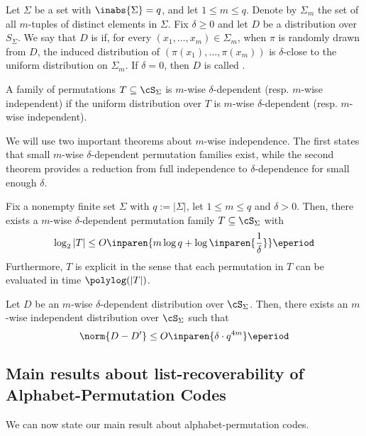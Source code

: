 \documentclass[11pt]{article}
\begin{document}
\begin{definition}
  Let $\Sigma$ be a set with $\inabs{\Sigma} = q$, and let $1 \le m \le q$. Denote by $\Sigma_m$ the set of all $m$-tuples of distinct elements in $\Sigma$. Fix $\delta \ge 0$ and let $D$ be a distribution over $S_\Sigma$. 
  We say that $D$ is  if, for every $(x_1,\dots,x_m) \in \Sigma_m$, when $\pi$ is randomly drawn from $D$, the induced distribution of $(\pi(x_1),\dots,\pi(x_m))$ is $\delta$-close to the uniform distribution on $\Sigma_m$. If $\delta = 0$, then $D$ is called .

  A family of permutations $T\subseteq \cS_\Sigma$ is $m$-wise $\delta$-dependent (resp. $m$-wise independent) if the uniform distribution over $T$ is $m$-wise $\delta$-dependent (resp. $m$-wise independent).
\end{definition}

We will use two important theorems about $m$-wise independence. The first states that small $m$-wise $\delta$-dependent permutation families exist, while the second theorem provides a reduction from full independence to $\delta$-dependence for small enough $\delta$.

\begin{theorem}\label{thm:KNR}
    Fix a nonempty finite set $\Sigma$ with $q := |\Sigma|$, let $1\le m\le q$ and $\delta > 0$. Then, there exists a $m$-wise $\delta$-dependent permutation family $T\subseteq \cS_\Sigma$ with $$\log_2|T| \le O\inparen{m\log q + \log \inparen{\frac 1 \delta}}\eperiod$$
    Furthermore, $T$ is explicit in the sense that each permutation in $T$ can be evaluated in time $\polylog(|T|)$. 
\end{theorem}

\begin{theorem}\label{thm:AL}
Let $D$ be an $m$-wise $\delta$-dependent distribution over $\cS_\Sigma$. Then, there exists an $m$-wise independent distribution over $\cS_\Sigma$ such that $$\norm{D-D'} \le O\inparen{\delta\cdot q^{4m}}\eperiod$$  
\end{theorem}

\subsection{Main results about list-recoverability of Alphabet-Permutation Codes}
We can now state our main result about alphabet-permutation codes.
\end{document}
